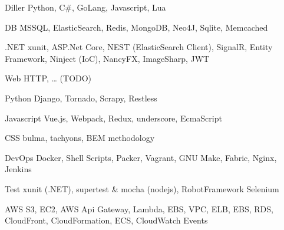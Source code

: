 

\begin{cvskills}



  \cvskill
    {Diller} %
    { Python, C\#, GoLang, Javascript, Lua } %

  
  \cvskill
    {DB}
    { MSSQL,  ElasticSearch, Redis, MongoDB, Neo4J, Sqlite, Memcached}
    
  \cvskill
    {.NET}
    { xunit, ASP.Net Core, NEST (ElasticSearch Client), SignalR, Entity Framework, Ninject (IoC), NancyFX, ImageSharp, JWT }
 
  \cvskill
    {Web}
    {HTTP, … (TODO)}
    
  \cvskill
    {Python}
    { Django, Tornado, Scrapy, Restless }

  \cvskill
    {Javascript}
    { Vue.js, Webpack, Redux, underscore, EcmaScript }

  \cvskill
    {CSS}
    { bulma, tachyons, BEM methodology }

  \cvskill
    {DevOps}
    { Docker, Shell Scripts, Packer, Vagrant, GNU Make, Fabric, Nginx, Jenkins }
  
  \cvskill
    {Test}
    { xunit (.NET), supertest \& mocha (nodejs), RobotFramework Selenium }
    
  \cvskill
    {AWS}
    { S3, EC2, AWS Api Gateway, Lambda, EBS, VPC, ELB, EBS, RDS, CloudFront, CloudFormation, ECS, CloudWatch Events }
         
\end{cvskills}



